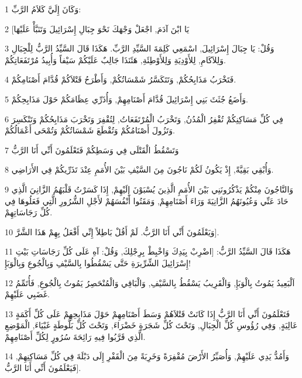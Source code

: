 \par 1 وَكَانَ إِلَيَّ كَلاَمُ الرَّبِّ:
\par 2 [يَا ابْنَ آدَمَ, اجْعَلْ وَجْهَكَ نَحْوَ جِبَالِ إِسْرَائِيلَ وَتَنَبَّأْ عَلَيْهَا
\par 3 وَقُلْ: يَا جِبَالَ إِسْرَائِيلَ, اسْمَعِي كَلِمَةَ السَّيِّدِ الرَّبِّ. هَكَذَا قَالَ السَّيِّدُ الرَّبُّ لِلْجِبَالِ وَلِلآكَامِ, لِلأَوْدِيَةِ وَلِلأَوْطِئَةِ, هَئَنَذَا جَالِبٌ عَلَيْكُمْ سَيْفاً وَأُبِيدُ مُرْتَفَعَاتِكُمْ.
\par 4 فَتَخْرَبُ مَذَابِحُكُمْ, وَتَتَكَسَّرُ شَمْسَاتُكُمْ, وَأَطْرَحُ قَتْلاَكُمْ قُدَّامَ أَصْنَامِكُمْ.
\par 5 وَأَضَعُ جُثَثَ بَنِي إِسْرَائِيلَ قُدَّامَ أَصْنَامِهِمْ, وَأُذَرِّي عِظَامَكُمْ حَوْلَ مَذَابِحِكُمْ.
\par 6 فِي كُلِّ مَسَاكِنِكُمْ تُقْفِرُ الْمُدُنُ, وَتَخْرَبُ الْمُرْتَفَعَاتُ, لِتُقْفِرَ وَتَخْرَبَ مَذَابِحُكُمْ وَتَنْكَسِرَ وَتَزُولَ أَصْنَامُكُمْ وَتُقْطَعَ شَمْسَاتُكُمْ وَتُمْحَى أَعْمَالُكُمْ.
\par 7 وَتَسْقُطُ الْقَتْلَى فِي وَسَطِكُمْ فَتَعْلَمُونَ أَنِّي أَنَا الرَّبُّ
\par 8 وَأُبْقِي بَقِيَّةً, إِذْ يَكُونُ لَكُمْ نَاجُونَ مِنَ السَّيْفِ بَيْنَ الأُمَمِ عِنْدَ تَذَرِّيكُمْ فِي الأَرَاضِي.
\par 9 وَالنَّاجُونَ مِنْكُمْ يَذْكُرُونَنِي بَيْنَ الأُمَمِ الَّذِينَ يُسْبَوْنَ إِلَيْهِمْ, إِذَا كَسَرْتُ قَلْبَهُمُ الزَّانِيَ الَّذِي حَادَ عَنِّي وَعُيُونَهُمُ الزَّانِيَةَ وَرَاءَ أَصْنَامِهِمْ, وَمَقَتُوا أَنْفُسَهُمْ لأَجْلِ الشُّرُورِ الَّتِي فَعَلُوهَا فِي كُلِّ رَجَاسَاتِهِمْ.
\par 10 وَيَعْلَمُونَ أَنِّي أَنَا الرَّبُّ. لَمْ أَقُلْ بَاطِلاً إِنِّي أَفْعَلُ بِهِمْ هَذَا الشَّرَّ].
\par 11 هَكَذَا قَالَ السَّيِّدُ الرَّبُّ: [اضْرِبْ بِيَدِكَ وَاخْبِطْ بِرِجْلِكَ, وَقُلْ: آهِ عَلَى كُلِّ رَجَاسَاتِ بَيْتِ إِسْرَائِيلَ الشِّرِّيرَةِ حَتَّى يَسْقُطُوا بِالسَّيْفِ وَبِالْجُوعِ وَبِالْوَبَإِ!
\par 12 اَلْبَعِيدُ يَمُوتُ بِالْوَبَإِ, وَالْقَرِيبُ يَسْقُطُ بِالسَّيْفِ, وَالْبَاقِي وَالْمُنْحَصِرُ يَمُوتُ بِالْجُوعِ, فَأُتَمِّمُ غَضَبِي عَلَيْهِمْ.
\par 13 فَتَعْلَمُونَ أَنِّي أَنَا الرَّبُّ إِذَا كَانَتْ قَتْلاَهُمْ وَسَطَ أَصْنَامِهِمْ حَوْلَ مَذَابِحِهِمْ عَلَى كُلِّ أَكَمَةٍ عَالِيَةٍ, وَفِي رُؤُوسِ كُلِّ الْجِبَالِ, وَتَحْتَ كُلِّ شَجَرَةٍ خَضْرَاءَ, وَتَحْتَ كُلِّ بَلُّوطَةٍ غَبْيَاءَ, الْمَوْضِعِ الَّذِي قَرَّبُوا فِيهِ رَائِحَةَ سُرُورٍ لِكُلِّ أَصْنَامِهِمْ.
\par 14 وَأَمُدُّ يَدِي عَلَيْهِمْ, وَأُصَيِّرُ الأَرْضَ مُقْفِرَةً وَخَرِبَةً مِنَ الْقَفْرِ إِلَى دَبْلَةَ فِي كُلِّ مَسَاكِنِهِمْ, فَيَعْلَمُونَ أَنِّي أَنَا الرَّبُّ].

